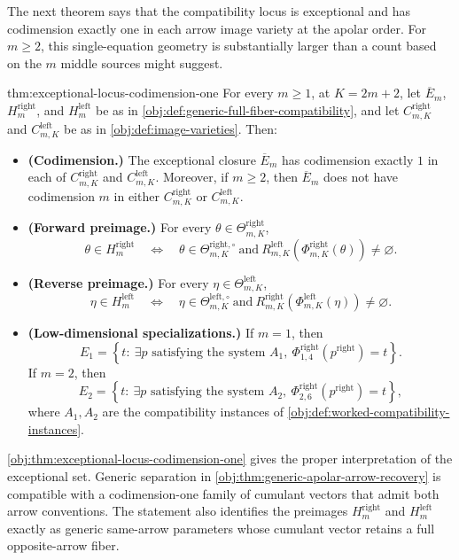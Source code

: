 \documentclass[11pt]{article}
\begin{document}
The next theorem says that the compatibility locus is exceptional and has codimension exactly one in each arrow image variety at the apolar order. For \(m\ge2\), this single-equation geometry is substantially larger than a count based on the \(m\) middle sources might suggest.

\begin{theoremv}{thm:exceptional-locus-codimension-one}
For every \(m\geq 1\), at \(K=2m+2\), let \(\overline E_m\), \(H^{\mathrm{right}}_m\), and \(H^{\mathrm{left}}_m\) be as in \cref{obj:def:generic-full-fiber-compatibility}, and let \(C^{\mathrm{right}}_{m,K}\) and \(C^{\mathrm{left}}_{m,K}\) be as in \cref{obj:def:image-varieties}. Then:
\begin{itemize}
\item \textbf{(Codimension.)} The exceptional closure \(\overline E_m\) has codimension exactly \(1\) in each of \(C^{\mathrm{right}}_{m,K}\) and \(C^{\mathrm{left}}_{m,K}\). Moreover, if \(m\geq 2\), then \(\overline E_m\) does not have codimension \(m\) in either \(C^{\mathrm{right}}_{m,K}\) or \(C^{\mathrm{left}}_{m,K}\).

\item \textbf{(Forward preimage.)} For every \(\theta\in\Theta^{\mathrm{right}}_{m,K}\),
\[
\theta\in H^{\mathrm{right}}_m
\quad\Longleftrightarrow\quad
\theta\in\Theta^{\mathrm{right},\circ}_{m,K}
\ \text{and}\
R^{\mathrm{left}}_{m,K}\!\left(\Phi^{\mathrm{right}}_{m,K}(\theta)\right)\neq\varnothing .
\]

\item \textbf{(Reverse preimage.)} For every \(\eta\in\Theta^{\mathrm{left}}_{m,K}\),
\[
\eta\in H^{\mathrm{left}}_m
\quad\Longleftrightarrow\quad
\eta\in\Theta^{\mathrm{left},\circ}_{m,K}
\ \text{and}\
R^{\mathrm{right}}_{m,K}\!\left(\Phi^{\mathrm{left}}_{m,K}(\eta)\right)\neq\varnothing .
\]

\item \textbf{(Low-dimensional specializations.)} If \(m=1\), then
\[
E_1
=
\left\{
t:\ \exists p\text{ satisfying the system }A_1,\ 
\Phi^{\mathrm{right}}_{1,4}(p^{\mathrm{right}})=t
\right\}.
\]
If \(m=2\), then
\[
E_2
=
\left\{
t:\ \exists p\text{ satisfying the system }A_2,\ 
\Phi^{\mathrm{right}}_{2,6}(p^{\mathrm{right}})=t
\right\},
\]
where \(A_1,A_2\) are the compatibility instances of \cref{obj:def:worked-compatibility-instances}.
\end{itemize}
\end{theoremv}

\cref{obj:thm:exceptional-locus-codimension-one} gives the proper interpretation of the exceptional set. Generic separation in \cref{obj:thm:generic-apolar-arrow-recovery} is compatible with a codimension-one family of cumulant vectors that admit both arrow conventions. The statement also identifies the preimages \(H^{\mathrm{right}}_m\) and \(H^{\mathrm{left}}_m\) exactly as generic same-arrow parameters whose cumulant vector retains a full opposite-arrow fiber.
\end{document}
